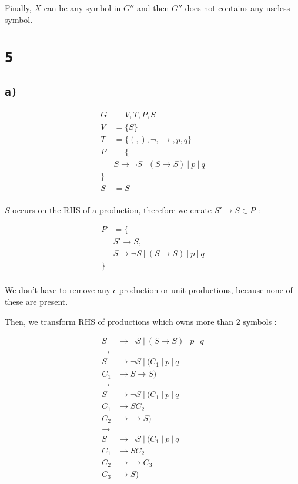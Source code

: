 \documentclass[a4paper,11pt]{report}
\begin{document}
Finally, $X$ can be any symbol in $G''$ and then $G''$ does not contains any
useless symbol.


\section*{\texttt{5}}

\subsection*{\texttt{a)}}

\begin{align*}
  G &= {V,T,P,S} \\
  V &= \{S\}\\
  T &= \{(,),\neg,\to,p,q\}\\
  P &= \{\\
  &S \to \neg S\ |\ (S \to S)\ |\ p\ |\ q \\
  \}\\
  S &= S\\
\end{align*}

$S$ occurs on the RHS of a production, therefore we create $S' \to S \in P$ :

\begin{align*}
  P &= \{\\
  &S' \to S, \\
  &S \to \neg S\ |\ (S \to S)\ |\ p\ |\ q \\
  \}\\
\end{align*}

We don't have to remove any $\epsilon$-production or unit productions, because
none of these are present.

Then, we transform RHS of productions which owns more than $2$ symbols :

\begin{align*}
  S &\to \neg S\ |\ (S \to S)\ |\ p\ |\ q \\
  \longrightarrow \\
  S &\to \neg S\ |\ (C_1     \ |\ p\ |\ q \\
  C_1 &\to S \to S ) \\
  \longrightarrow \\
  S &\to \neg S\ |\ (C_1     \ |\ p\ |\ q \\
  C_1 &\to S C_2 \\
  C_2 &\to \to S ) \\
  \longrightarrow \\
  S &\to \neg S\ |\ (C_1     \ |\ p\ |\ q \\
  C_1 &\to S C_2 \\
  C_2 &\to \to C_3 \\
  C_3 &\to S )
\end{align*}
\end{document}
